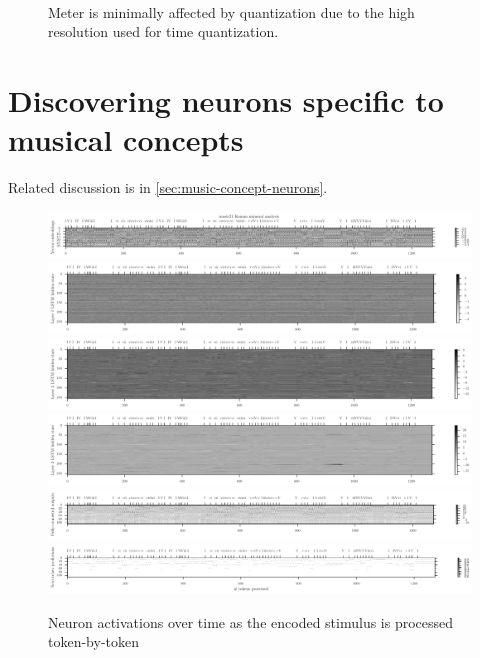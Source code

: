 \begin{figure}[htbp]
    \centering
    \begin{subfigure}[t]{0.48\textwidth}
        \centering
        
    \end{subfigure}
    ~
    \begin{subfigure}[t]{0.48\textwidth}
        \centering
        
    \end{subfigure}
    \caption{Meter is minimally affected by quantization due to the high resolution used for
    time quantization.}
    \label{fig:meter-time-quantization}
\end{figure}

\section{Discovering neurons specific to musical concepts}

Related discussion is in \vref{sec:music-concept-neurons}.

\begin{figure}[htbp]
    \centering
    \includegraphics[width=1.0\linewidth]{model-analysis-tokens-0.pdf}
    \includegraphics[width=1.0\linewidth]{model-analysis-tokens-1.pdf}
    \includegraphics[width=1.0\linewidth]{model-analysis-tokens-2.pdf}
    \includegraphics[width=1.0\linewidth]{model-analysis-tokens-3.pdf}
    \includegraphics[width=1.0\linewidth]{model-analysis-tokens-4.pdf}
    \includegraphics[width=1.0\linewidth]{model-analysis-tokens-5.pdf}
    \caption{Neuron activations over time as the encoded stimulus is processed token-by-token}
    \label{fig:model-analysis-tokens}
\end{figure}


